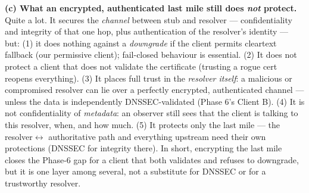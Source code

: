 \documentclass[11pt,a4paper]{article}
\begin{document}
\textbf{(c) What an encrypted, authenticated last mile still does \emph{not} protect.} Quite a lot.
It secures the \emph{channel} between stub and resolver --- confidentiality and integrity of that
one hop, plus authentication of the resolver's identity --- but: (1) it does nothing against a
\emph{downgrade} if the client permits cleartext fallback (our permissive client); fail-closed
behaviour is essential. (2) It does not protect a client that does not validate the certificate
(trusting a rogue cert reopens everything). (3) It places full trust in the \emph{resolver itself}:
a malicious or compromised resolver can lie over a perfectly encrypted, authenticated channel ---
unless the data is independently DNSSEC-validated (Phase 6's Client B). (4) It is not
confidentiality of \emph{metadata}: an observer still sees that the client is talking to this
resolver, when, and how much. (5) It protects only the last mile --- the resolver$\leftrightarrow$
authoritative path and everything upstream need their own protections (DNSSEC for integrity there).
In short, encrypting the last mile closes the Phase-6 gap for a client that both validates and
refuses to downgrade, but it is one layer among several, not a substitute for DNSSEC or for a
trustworthy resolver.
\end{document}

